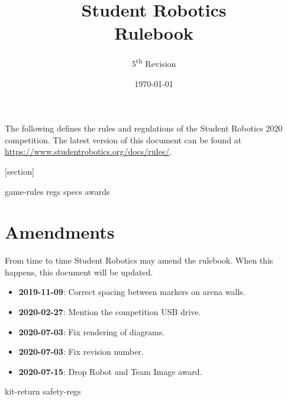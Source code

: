 \documentclass[a4paper, 11pt]{scrartcl}
\title {Student Robotics \sryear\\ Rulebook}
\author{5\textsuperscript{th} Revision}
\date{\today}
\newcommand{\sryear}{2020}
\begin{document}
\maketitle

\noindent The following defines the rules and regulations of the Student Robotics \sryear {} competition.  The latest version of this document can be found at \url{https://www.studentrobotics.org/docs/rules/}.

[section]
\newcommand{\rcn}{\stepcounter{rule}\arabic{section}.\arabic{rule}}
\newcommand{\rcnappendix}{\stepcounter{rule}\Alph{section}.\arabic{rule}}
\renewcommand{\labelenumi}{\rcn}

 {game-rules}
\newpage
 {regs}
\newpage
 {specs}
\newpage
 {awards}

\renewcommand{\labelenumi}{\rcn}

\section{Amendments}
From time to time Student Robotics may amend the rulebook.  When this happens, this document will be updated.

\begin{itemize}
\item \textbf{2019-11-09}: Correct spacing between markers on arena walls.
\item \textbf{2020-02-27}: Mention the competition USB drive.
\item \textbf{2020-07-03}: Fix rendering of diagrams.
\item \textbf{2020-07-03}: Fix revision number.
\item \textbf{2020-07-15}: Drop Robot and Team Image award.
\end{itemize}

\newpage
\appendix
\renewcommand{\labelenumi}{\rcnappendix}
\appendixpage
\addappheadtotoc
 {kit-return}
 {safety-regs}
\end{document}
